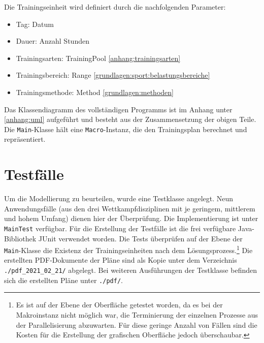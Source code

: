 Die Trainingseinheit wird definiert durch die nachfolgenden Parameter:
\begin{itemize}[topsep=0pt, parsep=0pt]
    \item Tag: Datum
    \item Dauer: Anzahl Stunden
    \item Trainingsarten: TrainingPool \ref{anhang:trainingsarten}
    \item Trainingsbereich: Range \ref{grundlagen:sport:belastungsbereiche}
    \item Trainingsmethode: Method \ref{grundlagen:methoden}
\end{itemize}
Das Klassendiagramm des vollständigen Programms ist im Anhang unter \ref{anhang:uml} aufgeführt und besteht aus der Zusammensetzung der obigen Teile. Die \texttt{Main}-Klasse hält eine \texttt{Macro}-Instanz, die den Trainingsplan berechnet und repräsentiert.

\section{Testfälle}
Um die Modellierung zu beurteilen, wurde eine Testklasse angelegt. Neun Anwendungsfälle (aus den drei Wettkampfdisziplinen mit je geringem, mittlerem und hohem Umfang) dienen hier der Überprüfung. Die Implementierung ist unter \texttt{MainTest} verfügbar. 
Für die Erstellung der Testfälle ist die frei verfügbare Java-Bibliothek JUnit verwendet worden. Die Tests überprüfen auf der Ebene der \texttt{Main}-Klasse die Existenz der Trainingseinheiten nach dem Lösungsprozess.\footnote{Es ist auf der Ebene der Oberfläche getestet worden, da es bei der Makroinstanz nicht möglich war, die Terminierung der einzelnen Prozesse aus der Parallelisierung abzuwarten. Für diese geringe Anzahl von Fällen sind die Kosten für die Erstellung der grafischen Oberfläche jedoch überschaubar.} 
Die erstellten PDF-Dokumente der Pläne sind als Kopie unter dem Verzeichnis \texttt{./pdf\_2021\_02\_21/} abgelegt. Bei weiteren Ausführungen der Testklasse befinden sich die erstellten Pläne unter \texttt{./pdf/}.


